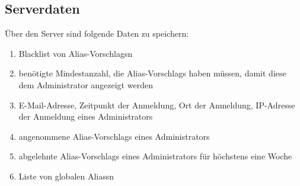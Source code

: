 \subsection{Serverdaten}

Über den Server sind folgende Daten zu speichern:
\begin{enumerate}[label=\textbf{/D\arabic*0/}, align=left, resume]
	\item Blacklist von \Glspl{Alias-Vorschlag}n
	\item benötigte Mindestanzahl, die \Glspl{Alias-Vorschlag} haben müssen, damit diese dem Administrator angezeigt werden
	\item E-Mail-Adresse, Zeitpunkt der Anmeldung, Ort der Anmeldung, IP-Adresse der Anmeldung eines Administrators
	\item angenommene \Glspl{Alias-Vorschlag} eines Administrators
	\item abgelehnte \Glspl{Alias-Vorschlag} eines Administrators für höchstens eine Woche
	\item Liste von globalen \Glspl{Alias}n
\end{enumerate}